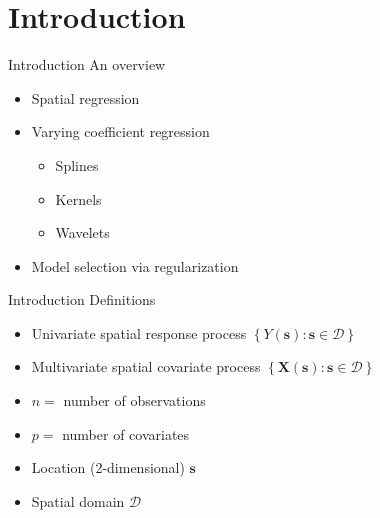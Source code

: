\documentclass[12pt,t]{beamer}
\newcommand{\subt}[1]{{\footnotesize \color{subtitle} {#1}}}
\begin{document}
\section{Introduction}



\begin{frame}{Introduction}
\subt{An overview}

\bigskip
\begin{itemize}
    \item Spatial regression
    \item Varying coefficient regression
    \begin{itemize}
        \item Splines
        \item Kernels
        \item Wavelets
    \end{itemize}
    \item Model selection via regularization
\end{itemize}

\end{frame}






\begin{frame}{Introduction}
\subt{Definitions}

\bigskip
\begin{itemize}
    \item Univariate spatial response process $\left\{ Y(\bm{s}) : \bm{s} \in \mathcal{D} \right\}$
    \item Multivariate spatial covariate process $\left\{ \bm{X}(\bm{s}) : \bm{s} \in \mathcal{D} \right\}$
    \item $n = $ number of observations
    \item $p = $ number of covariates
    \item Location (2-dimensional) $\bm{s}$
    \item Spatial domain $\mathcal{D}$
\end{itemize}


\end{frame}
\end{document}
